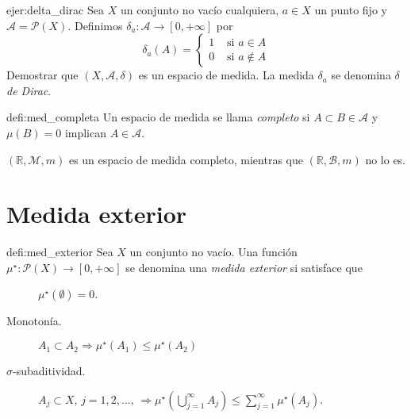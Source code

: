 \begin{ejercicio}{ejer:delta_dirac}
 Sea $X$ un conjunto no vacío cualquiera, $a\in X$ un punto fijo y $\mathscr{A}=\mathcal{P}(X)$. Definimos $\delta_a:\mathscr{A}\to [0,+\infty]$ por
 \[
  \delta_a(A)=\left\{\begin{array}{ll} 1 &\text{ si } a\in A\\0 &\text{ si } a\notin A\end{array}\right.
 \]
 Demostrar que $(X,\mathscr{A},\delta)$ es un espacio de medida. La medida $\delta_a$
se denomina \emph{$\delta$ de Dirac}. 
\end{ejercicio}
\begin{definicion}{defi:med_completa}
 Un espacio de medida  se llama \emph{completo} si $A\subset B\in\mathscr{A}$ y $\mu(B)=0$ implican $A\in\mathscr{A}$.
\end{definicion}

\begin{ejemplo}{}  $(\mathbb{R},\mathscr{M},m)$ es un espacio de medida completo, mientras que $(\mathbb{R},\mathscr{B},m)$ no lo es.
\end{ejemplo}





\section{Medida exterior}

\begin{definicion}{defi:med_exterior}
Sea $X$ un conjunto no vacío. Una función $\mu^\star:\mathcal{P}(X)\to [0,+\infty]$ se denomina una \emph{medida exterior} si satisface que  	
  \begin{description}
   \item[] $\mu^\star(\emptyset)=0$. 
   \item[Monotonía.] $A_1\subset A_2\Rightarrow \mu^\star(A_1)\leq \mu^\star(A_2)$ 
   \item[$\sigma$-subaditividad.] $A_j\subset X$, $j=1,2,\ldots$, $\Rightarrow  \mu^\star\left(\bigcup_{j=1}^{\infty}A_j\right)\leq\sum_{j=1}^{\infty}\mu^\star(A_j)$.
   \end{description}


\end{definicion}

